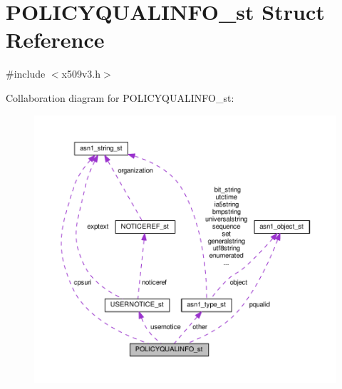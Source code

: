 \hypertarget{struct_p_o_l_i_c_y_q_u_a_l_i_n_f_o__st}{}\section{P\+O\+L\+I\+C\+Y\+Q\+U\+A\+L\+I\+N\+F\+O\+\_\+st Struct Reference}
\label{struct_p_o_l_i_c_y_q_u_a_l_i_n_f_o__st}


{\ttfamily \#include $<$x509v3.\+h$>$}



Collaboration diagram for P\+O\+L\+I\+C\+Y\+Q\+U\+A\+L\+I\+N\+F\+O\+\_\+st\+:
\nopagebreak
\begin{figure}[H]
\begin{center}
\leavevmode
\includegraphics[width=350pt]{struct_p_o_l_i_c_y_q_u_a_l_i_n_f_o__st__coll__graph}
\end{center}
\end{figure}
